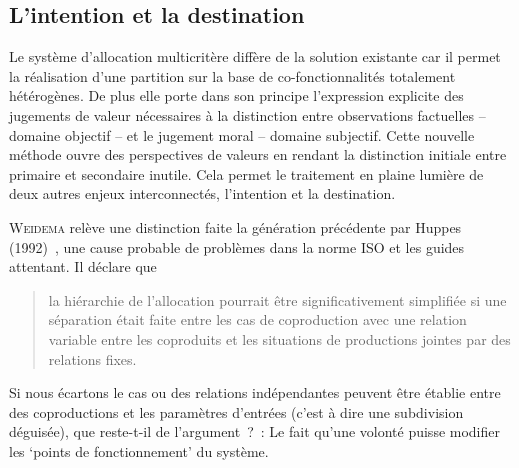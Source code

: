 \subsection{L'intention et la destination}
Le système d'allocation multicritère diffère de la solution existante car il permet la réalisation d'une partition sur la base de co-fonctionnalités totalement hétérogènes.
De plus elle porte dans son principe l'expression explicite des jugements de valeur nécessaires à la distinction entre observations factuelles -- domaine objectif -- et le jugement moral -- domaine subjectif.
Cette nouvelle méthode ouvre des perspectives de valeurs en rendant la distinction initiale entre primaire et secondaire inutile.
Cela permet le traitement en plaine lumière de deux autres enjeux interconnectés, l'intention et la destination.

\textsc{Weidema} relève une distinction faite la génération précédente par Huppes (1992)~\cite{weidema_avoiding_2000}, une cause probable de problèmes dans la norme ISO et les guides attentant.
Il déclare que
\blockcquote[traduction]{weidema_has_2014}{la hiérarchie de l'allocation pourrait être significativement simplifiée si une séparation était faite entre les cas de coproduction avec une relation variable entre les coproduits et les situations de productions jointes par des relations fixes.}

Si nous écartons le cas ou des relations indépendantes peuvent être établie entre des coproductions et les paramètres d'entrées (c'est à dire une subdivision déguisée), que reste-t-il de l'argument~?~:
Le fait qu'une volonté puisse modifier les `points de fonctionnement' du système.



